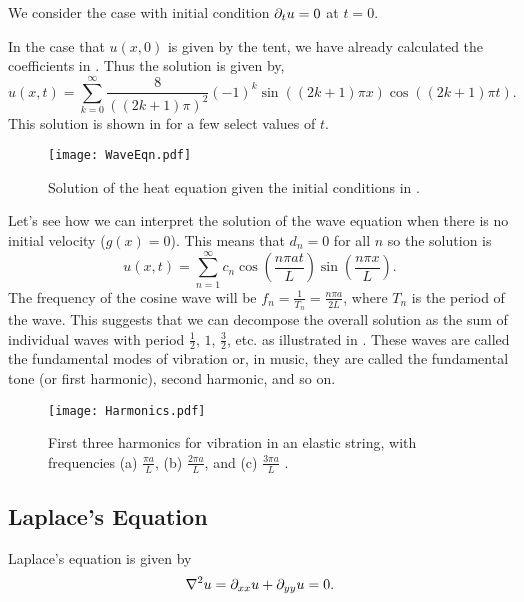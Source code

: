 \begin{eg}\label{eg:waveeqn}
	We consider the case with initial condition $\partial_t u = 0$ at $t=0$.
	
	In the case that $u(x,0)$ is given by the tent, we have already calculated the coefficients in . Thus the solution is given by, 
	\[
	u(x,t) = \sum_{k=0}^{\infty} \frac{8}{((2k+1)\pi)^2} (-1)^k \sin\left((2k+1)\pi x\right)\cos\left((2k+1)\pi t\right).
	\]
	This solution is shown in  for a few select values of $t$.
\end{eg}

\begin{figure}[!ht]
	\centering
	\texttt{[image: WaveEqn.pdf]}
	\caption{Solution of the heat equation given the initial conditions in .}
	\label{fig:waveeqn}
\end{figure}

\begin{eg}
	Let's see how we can interpret the solution of the wave equation when there is no initial velocity ($g(x) = 0$). This means that $d_n = 0$ for all $n$ so the solution is
	\[
	u(x,t) = \sum_{n=1}^{\infty} c_n \cos\left(\frac{n\pi at}{L}\right) \sin\left(\frac{n\pi x}{L}\right).
	\]
	The frequency of the cosine wave will be $f_n = \frac{1}{T_n} = \frac{n\pi a}{2L}$, where $T_n$ is the period of the wave. This suggests that we can decompose the overall solution as the sum of individual waves with period $\frac12$, $1$, $\frac32$, etc. as illustrated in . These waves are called the fundamental modes of vibration or, in music, they are called the fundamental tone (or first harmonic), second harmonic, and so on.
\end{eg}

\begin{figure}[!ht]
	\centering
	\texttt{[image: Harmonics.pdf]}
	\caption{First three harmonics for vibration in an elastic string, with frequencies (a) $\frac{\pi a}{L}$, (b) $\frac{2\pi a}{L}$, and (c) $\frac{3\pi a}{L}$ \cite[Figure 10.7.3]{boyce}.} 
	\label{fig:harmonics}
\end{figure}

\subsection{Laplace's Equation}

Laplace's equation is given by
\begin{equation}
	\nabla^2u = \partial_{xx}u + \partial_{yy}u = 0.
\end{equation}

